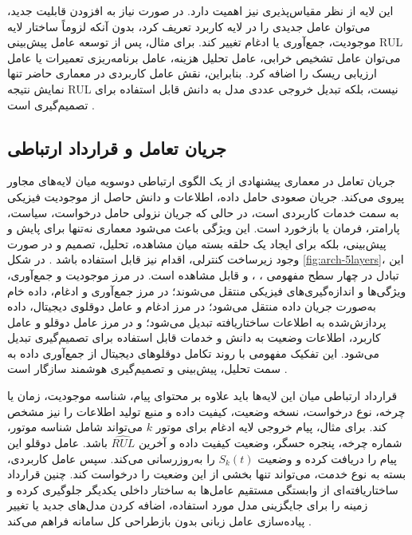 این لایه از نظر مقیاس‌پذیری نیز اهمیت دارد. در صورت نیاز به افزودن قابلیت جدید، می‌توان عامل جدیدی را در لایه کاربرد تعریف کرد، بدون آنکه لزوماً ساختار لایه موجودیت، جمع‌آوری یا ادغام تغییر کند. برای مثال، پس از توسعه عامل پیش‌بینی \gls{RUL} می‌توان عامل تشخیص خرابی، عامل تحلیل هزینه، عامل برنامه‌ریزی تعمیرات یا عامل ارزیابی ریسک را اضافه کرد. بنابراین، نقش عامل کاربردی در معماری حاضر تنها نمایش نتیجه \gls{RUL} نیست، بلکه تبدیل خروجی عددی مدل به دانش قابل استفاده برای تصمیم‌گیری است \cite{xagentmaint2026}.


\subsection{جریان تعامل و قرارداد ارتباطی}
\label{sec:arch-interaction}

جریان تعامل در معماری پیشنهادی از یک الگوی ارتباطی دوسویه میان لایه‌های مجاور پیروی می‌کند. جریان صعودی حامل داده، اطلاعات و دانش حاصل از موجودیت فیزیکی به سمت خدمات کاربردی است، در حالی که جریان نزولی حامل درخواست، سیاست، پارامتر، فرمان یا بازخورد است. این ویژگی باعث می‌شود معماری نه‌تنها برای پایش و پیش‌بینی، بلکه برای ایجاد یک حلقه بسته میان مشاهده، تحلیل، تصمیم و در صورت وجود زیرساخت کنترلی، اقدام نیز قابل استفاده باشد \cite{tao2019digital,qi2021enabling}. در شکل \ref{fig:arch-5layers}، این تبادل در چهار سطح مفهومی ، ،  و  قابل مشاهده است. در مرز موجودیت و جمع‌آوری، ویژگی‌ها و اندازه‌گیری‌های فیزیکی منتقل می‌شوند؛ در مرز جمع‌آوری و ادغام، داده خام به‌صورت جریان داده منتقل می‌شود؛ در مرز ادغام و عامل دوقلوی دیجیتال، داده پردازش‌شده به اطلاعات ساختاریافته تبدیل می‌شود؛ و در مرز عامل دوقلو و عامل کاربرد، اطلاعات وضعیت به دانش و خدمات قابل استفاده برای تصمیم‌گیری تبدیل می‌شود. این تفکیک مفهومی با روند تکامل دوقلو‌های دیجیتال از جمع‌آوری داده به سمت تحلیل، پیش‌بینی و تصمیم‌گیری هوشمند سازگار است \cite{fuller2020digital,zhou2026dtai,fu2026genaidt}.

قرارداد ارتباطی میان این لایه‌ها باید علاوه بر محتوای پیام، شناسه موجودیت، زمان یا چرخه، نوع درخواست، نسخه وضعیت، کیفیت داده و منبع تولید اطلاعات را نیز مشخص کند. برای مثال، پیام خروجی لایه ادغام برای موتور $k$ می‌تواند شامل شناسه موتور، شماره چرخه، پنجره حسگر، وضعیت کیفیت داده و آخرین $\widehat{RUL}$ باشد. عامل دوقلو این پیام را دریافت کرده و وضعیت $S_k(t)$ را به‌روزرسانی می‌کند. سپس عامل کاربردی، بسته به نوع خدمت، می‌تواند تنها بخشی از این وضعیت را درخواست کند. چنین قرارداد ساختاریافته‌ای از وابستگی مستقیم عامل‌ها به ساختار داخلی یکدیگر جلوگیری کرده و زمینه را برای جایگزینی مدل مورد استفاده، اضافه کردن مدل‌های جدید یا تغییر پیاده‌سازی عامل زبانی بدون بازطراحی کل سامانه فراهم می‌کند \cite{park2026hybriddt}.

